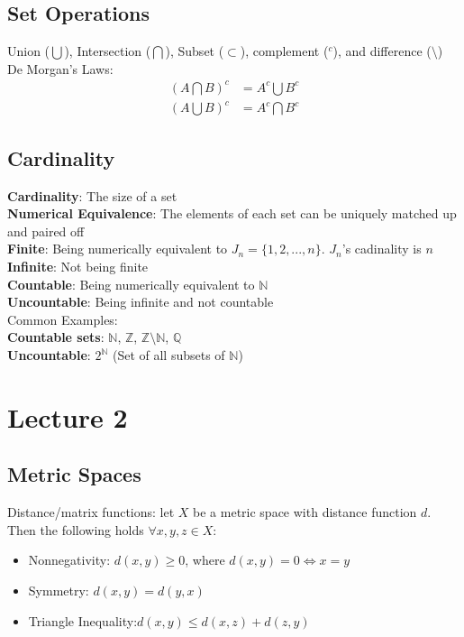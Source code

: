 \documentclass{article}
\newcommand{\intersect}{\bigcap}
\newcommand{\union}{\bigcup}
\newcommand{\N}{\mathbb{N}}
\newcommand{\Z}{\mathbb{Z}}
\newcommand{\Q}{\mathbb{Q}}
\begin{document}
\subsection{Set Operations}
Union ($\bigcup$), Intersection ($\bigcap$), Subset ($\subset$), complement ($^c$), and difference ($\setminus$)
\medskip \\
De Morgan's Laws:
\begin{align*}
	(A\bigcap B)^c	&= A^c\bigcup B^c 	\\
	(A\union B)^c 	&= A^c\intersect B^c
\end{align*}

\subsection{Cardinality}
\textbf{Cardinality}: The size of a set 
\smallskip \\
\textbf{Numerical Equivalence}: The elements of each set can be uniquely matched up and paired off 
\smallskip \\
\textbf{Finite}: Being numerically equivalent to $J_n=\{1,2,...,n\}$. $J_n$'s cadinality is $n$ 
\smallskip \\
\textbf{Infinite}: Not being finite 
\smallskip \\
\textbf{Countable}: Being numerically equivalent to $\N$
\smallskip  \\
\textbf{Uncountable}: Being infinite and not countable
\medskip \\
Common Examples: 
\smallskip \\
\indent \textbf{Countable sets}: $\N$, $\Z$, $\Z\setminus\N$, $\Q$
\smallskip  \\
\indent \textbf{Uncountable}: $2^\N$ (Set of all subsets of $\N$)



\section{Lecture 2}

\subsection{Metric Spaces}
Distance/matrix functions: let $X$ be a metric space  with distance function $d$. Then the following holds $\forall x,y,z\in X$:
\begin{itemize}
	\item Nonnegativity: $d(x,y)\geq 0$, where $d(x,y)=0\iff x=y$
	
	\item Symmetry: $d(x,y)=d(y,x)$
	
	\item Triangle Inequality:$d(x,y)\leq d(x,z) + d(z,y)$
\end{itemize}
\end{document}

